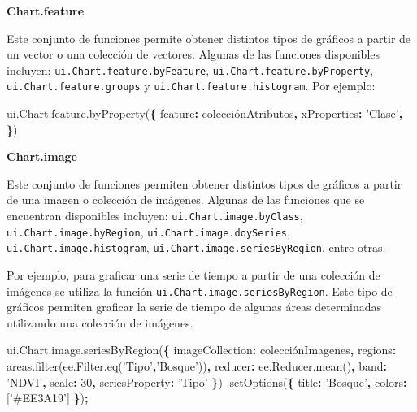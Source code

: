 \documentclass[
]{article}
\newenvironment{Shaded}{\begin{snugshade}}{\end{snugshade}}
\newcommand{\AttributeTok}[1]{\textcolor[rgb]{0.77,0.63,0.00}{#1}}
\newcommand{\DataTypeTok}[1]{\textcolor[rgb]{0.13,0.29,0.53}{#1}}
\newcommand{\DecValTok}[1]{\textcolor[rgb]{0.00,0.00,0.81}{#1}}
\newcommand{\NormalTok}[1]{#1}
\newcommand{\OperatorTok}[1]{\textcolor[rgb]{0.81,0.36,0.00}{\textbf{#1}}}
\newcommand{\StringTok}[1]{\textcolor[rgb]{0.31,0.60,0.02}{#1}}
\newcommand{\VariableTok}[1]{\textcolor[rgb]{0.00,0.00,0.00}{#1}}
\begin{document}
\textbf{Chart.feature}

Este conjunto de funciones permite obtener distintos tipos de gráficos a
partir de un vector o una colección de vectores. Algunas de las
funciones disponibles incluyen: \texttt{ui.Chart.feature.byFeature},
\texttt{ui.Chart.feature.byProperty}, \texttt{ui.Chart.feature.groups} y
\texttt{ui.Chart.feature.histogram}. Por ejemplo:

\begin{Shaded}
\begin{Highlighting}[]
\VariableTok{ui}\NormalTok{.}\VariableTok{Chart}\NormalTok{.}\VariableTok{feature}\NormalTok{.}\AttributeTok{byProperty}\NormalTok{(}\OperatorTok{\{}
  \DataTypeTok{feature}\OperatorTok{:}\NormalTok{ colecciónAtributos}\OperatorTok{,} 
  \DataTypeTok{xProperties}\OperatorTok{:} \StringTok{'Clase'}\OperatorTok{,}
\OperatorTok{\}}\NormalTok{)}
\end{Highlighting}
\end{Shaded}

\textbf{Chart.image}

Este conjunto de funciones permiten obtener distintos tipos de gráficos
a partir de una imagen o colección de imágenes. Algunas de las funciones
que se encuentran disponibles incluyen: \texttt{ui.Chart.image.byClass},
\texttt{ui.Chart.image.byRegion}, \texttt{ui.Chart.image.doySeries},
\texttt{ui.Chart.image.histogram},
\texttt{ui.Chart.image.seriesByRegion}, entre otras.

Por ejemplo, para graficar una serie de tiempo a partir de una colección
de imágenes se utiliza la función
\texttt{ui.Chart.image.seriesByRegion}. Este tipo de gráficos permiten
graficar la serie de tiempo de algunas áreas determinadas utilizando una
colección de imágenes.

\begin{Shaded}
\begin{Highlighting}[]
\VariableTok{ui}\NormalTok{.}\VariableTok{Chart}\NormalTok{.}\VariableTok{image}\NormalTok{.}\AttributeTok{seriesByRegion}\NormalTok{(}\OperatorTok{\{}
  \DataTypeTok{imageCollection}\OperatorTok{:}\NormalTok{ colecciónImagenes}\OperatorTok{,} 
  \DataTypeTok{regions}\OperatorTok{:} \VariableTok{areas}\NormalTok{.}\AttributeTok{filter}\NormalTok{(}\VariableTok{ee}\NormalTok{.}\VariableTok{Filter}\NormalTok{.}\AttributeTok{eq}\NormalTok{(}\StringTok{'Tipo'}\OperatorTok{,}\StringTok{'Bosque'}\NormalTok{))}\OperatorTok{,}
  \DataTypeTok{reducer}\OperatorTok{:} \VariableTok{ee}\NormalTok{.}\VariableTok{Reducer}\NormalTok{.}\AttributeTok{mean}\NormalTok{()}\OperatorTok{,} 
  \DataTypeTok{band}\OperatorTok{:} \StringTok{'NDVI'}\OperatorTok{,} 
  \DataTypeTok{scale}\OperatorTok{:} \DecValTok{30}\OperatorTok{,} 
  \DataTypeTok{seriesProperty}\OperatorTok{:} \StringTok{'Tipo'}
\OperatorTok{\}}\NormalTok{)}
\NormalTok{  .}\AttributeTok{setOptions}\NormalTok{(}\OperatorTok{\{}
    \DataTypeTok{title}\OperatorTok{:} \StringTok{'Bosque'}\OperatorTok{,}
    \DataTypeTok{colors}\OperatorTok{:}\NormalTok{ [}\StringTok{'#EE3A19'}\NormalTok{]}
  \OperatorTok{\}}\NormalTok{)}\OperatorTok{;}
\end{Highlighting}
\end{Shaded}
\end{document}
